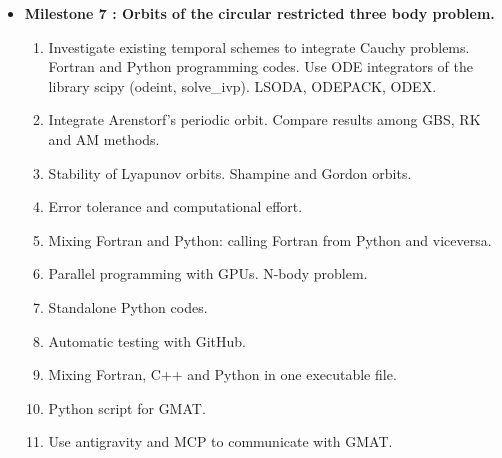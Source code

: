\documentclass[12pt, a4paper]{article}
\begin{document}
\begin{itemize}
\item {\bf Milestone 7 : Orbits of the circular restricted three body 
    problem.}    

 \begin{enumerate} 
    
     \item Investigate existing temporal schemes to integrate Cauchy problems. 
     Fortran and Python programming codes.  
     Use ODE integrators of the library scipy (odeint, solve\_ivp). 
     LSODA, ODEPACK, ODEX.  
     \item Integrate Arenstorf's periodic orbit. Compare results among GBS, RK and 
     AM methods.  
     \item Stability of Lyapunov orbits.  Shampine and Gordon orbits.
     \item Error tolerance and computational effort. 
     \item Mixing Fortran and Python: calling Fortran from Python and viceversa.
     \item Parallel programming with GPUs. N-body problem. 
     \item Standalone Python codes.  
     \item Automatic testing with GitHub.
     \item Mixing Fortran, C++ and Python in one executable file.
     \item Python script for GMAT.
     \item Use antigravity and MCP to communicate with GMAT.
    
 \end{enumerate}






 
 
\end{itemize}
\end{document}
